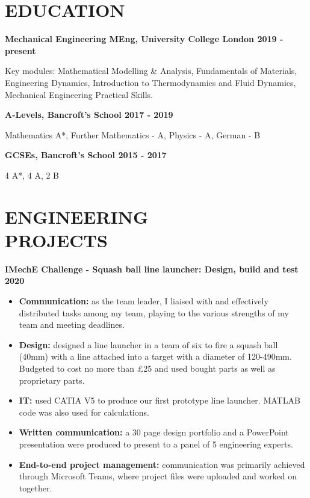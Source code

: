 \documentclass[margin, 10pt]{res} %
\begin{document}
\begin{resume}

 
\section{EDUCATION}  

\textbf{Mechanical Engineering MEng, University College London \hfill 2019 - present}

Key modules: Mathematical Modelling \& Analysis, Fundamentals of Materials,\\ 
Engineering Dynamics, Introduction to Thermodynamics and Fluid Dynamics, \\
Mechanical Engineering Practical Skills.

\textbf{A-Levels, Bancroft's School \hfill 2017 - 2019}

Mathematics A*, Further Mathematics - A, Physics - A, German - B

\textbf{GCSEs, Bancroft's School
\hfill 2015 - 2017}

4 A*, 4 A, 2 B



\section{ENGINEERING \\ PROJECTS}

\textbf{IMechE Challenge - Squash ball line launcher: Design, build and test \hfill 2020}
\\
\begin{itemize}
  \item \textbf{Communication:} as the team leader, I liaised with and effectively distributed tasks among my team, playing to the various strengths of my team and meeting deadlines.
  \item \textbf{Design:} designed a line launcher in a team of six to fire a squash ball (40\si{\milli\meter}) with a line attached into a target with a diameter of 120-490\si{\milli\meter}. Budgeted to cost no more than £25 and used bought parts as well as proprietary parts.
  \item \textbf{IT:} used CATIA V5 to produce our first prototype line launcher. MATLAB code was also used for calculations. 
  \item \textbf{Written communication:} a 30 page design portfolio and a PowerPoint presentation were produced to present to a panel of 5 engineering experts. 
  \item \textbf{End-to-end project management:} communication was primarily achieved through Microsoft Teams, where project files were uploaded and worked on together. 
\end{itemize}
 

\end{resume}
\end{document}
